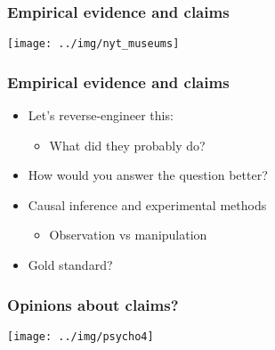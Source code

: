 \documentclass[aspectratio=43]{beamer}
\begin{document}
\begin{frame}
\frametitle{Empirical evidence and claims}
\centering

\texttt{[image: ../img/nyt\_museums]}

\end{frame}

\begin{frame}
\frametitle{Empirical evidence and claims}
\centering

\begin{itemize}
  \item Let's reverse-engineer this:
  \begin{itemize}
    \item What did they probably do?
  \end{itemize}
  \item How would you answer the question better?
  \item<2-> Causal inference and experimental methods
  \begin{itemize}
    \item Observation vs manipulation
  \end{itemize}
  \item<3-> Gold standard?
\end{itemize}

\end{frame}
  



\begin{frame}
\frametitle{Opinions about claims?}
\centering

\texttt{[image: ../img/psycho4]}

\end{frame}
\end{document}
